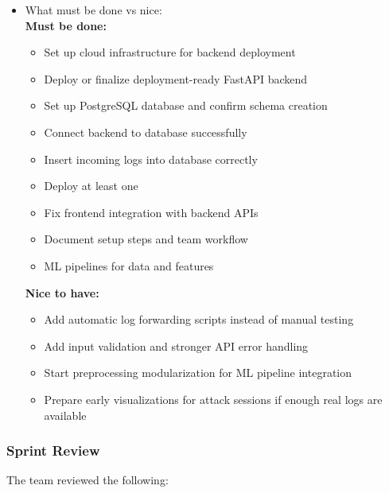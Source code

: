 \documentclass{article}
\begin{document}
\begin{itemize}
    \item What must be done vs nice:
    \\\textbf{Must be done:}
     \begin{itemize}
        \item Set up cloud infrastructure for backend deployment
        \item Deploy or finalize deployment-ready FastAPI backend
        \item Set up PostgreSQL database and confirm schema creation
        \item Connect backend to database successfully
        \item Insert incoming logs into database correctly
        \item Deploy at least one 
        \item Fix frontend integration with backend APIs
        \item Document setup steps and team workflow
        \item ML pipelines for data and features
    \end{itemize}
    \textbf{Nice to have:}
     \begin{itemize}
        \item Add automatic log forwarding scripts instead of manual testing
        \item Add input validation and stronger API error handling
        \item Start preprocessing modularization for ML pipeline integration
        \item Prepare early visualizations for attack sessions if enough real logs are available
    \end{itemize}

\end{itemize}

\subsubsection{Sprint Review}
The team reviewed the following:
\end{document}
